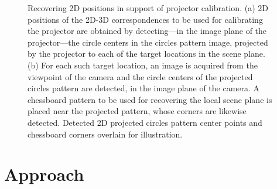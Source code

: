 \documentclass[review]{elsarticle}
\begin{document}
\begin{figure}
    \centering
    \qquad
    \caption{Recovering 2D positions in support of projector calibration. (a) 2D positions of the 2D-3D correspondences to be used for calibrating the projector are obtained by detecting---in the image plane of the projector---the circle centers in the circles pattern image, projected by the projector to each of the target locations in the scene plane. (b) For each such target location, an image is acquired from the viewpoint of the camera and the circle centers of the projected circles pattern are detected, in the image plane of the camera. A chessboard pattern to be used for recovering the local scene plane is placed near the projected pattern, whose corners are likewise detected. Detected 2D projected circles pattern center points and chessboard corners overlain for illustration.}
    \label{fig:2d}
\end{figure}

\section{Approach}
\end{document}
